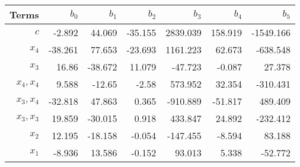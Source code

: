 \begin{tabular}{rrrrrrr}
Terms & $b_0$ & $b_1$ & $b_2$ & $b_3$ & $b_4$ & $b_5$ \\ 
\hline 
$c$ & -2.892 & 44.069 & -35.155 & 2839.039 & 158.919 & -1549.166 \\ 
$x_4$ & -38.261 & 77.653 & -23.693 & 1161.223 & 62.673 & -638.548 \\ 
$x_3$ & 16.86 & -38.672 & 11.079 & -47.723 & -0.087 & 27.378 \\ 
$x_4,x_4$ & 9.588 & -12.65 & -2.58 & 573.952 & 32.354 & -310.431 \\ 
$x_3,x_4$ & -32.818 & 47.863 & 0.365 & -910.889 & -51.817 & 489.409 \\ 
$x_3,x_3$ & 19.859 & -30.015 & 0.918 & 433.847 & 24.892 & -232.412 \\ 
$x_2$ & 12.195 & -18.158 & -0.054 & -147.455 & -8.594 & 83.188 \\ 
$x_1$ & -8.936 & 13.586 & -0.152 & 93.013 & 5.338 & -52.772 \\ 
\hline 
\end{tabular}